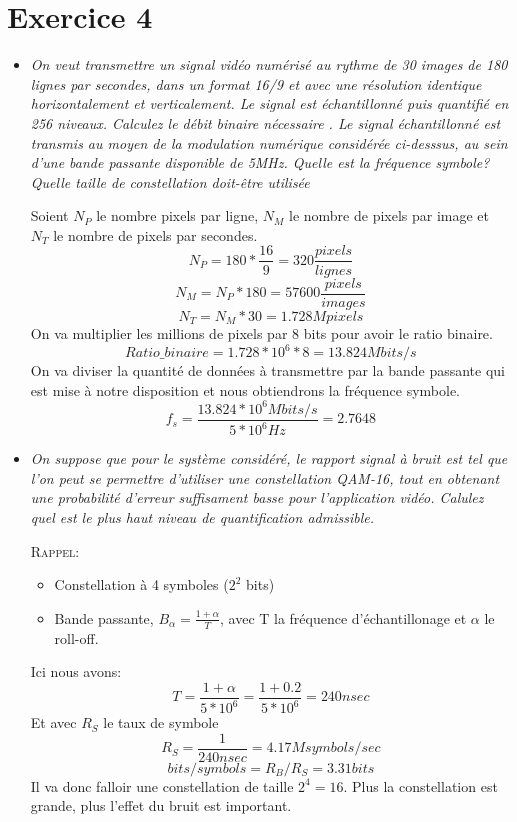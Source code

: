 \documentclass[a4paper, 11pt, onecolumn]{article}
\begin{document}
\section{Exercice 4}
	\begin{itemize}
		\item \textit{On veut transmettre un signal vidéo numérisé au rythme de 30 images de 180 lignes par secondes, dans un format 16/9 et avec une résolution identique horizontalement et verticalement. Le signal est échantillonné puis quantifié en 256 niveaux. Calculez le débit binaire nécessaire . Le signal échantillonné est transmis au moyen de la modulation numérique considérée ci-desssus, au sein d'une bande passante disponible de 5MHz. Quelle est la fréquence symbole? Quelle taille  de constellation doit-être utilisée}
		
		\begin{framed}
		Soient $N_P$ le nombre pixels par ligne, $N_M $ le nombre de pixels par image et $N_T$ le nombre de pixels par secondes.
		$$N_P = 180 *\frac{16}{9} = 320 \frac{pixels}{lignes}$$
		$$N_M = N_P*180 = 57600 \frac{pixels}{images}$$
		$$N_T = N_M * 30 = 1.728 Mpixels$$
		On va multiplier les millions de pixels par 8 bits pour avoir le ratio binaire.
		$$Ratio\_binaire = 1.728 * 10^6 * 8 = 13.824 Mbits/s$$
		On va diviser la quantité de données à transmettre par la bande passante qui est mise à notre disposition et nous obtiendrons la fréquence symbole.
		$$f_s = \frac{13.824 * 10^6 Mbits/s}{5 * 10^6 Hz} = 2.7648$$
		\end{framed}
		\item \textit{On suppose que pour le système considéré, le rapport signal à bruit est tel que l'on peut se permettre d'utiliser une constellation QAM-16, tout en obtenant une probabilité d'erreur suffisament basse pour l'application vidéo. Calulez quel est le plus haut niveau de quantification admissible.}
		\begin{framed}
			\textsc{Rappel:}
			\begin{itemize}
				\item Constellation à 4 symboles ($2^2$ bits)
				\item Bande passante, $B_\alpha = \frac{1+\alpha}{T}$, avec T la fréquence d'échantillonage et $\alpha$ le roll-off.
			\end{itemize}
			Ici nous avons:
			$$T = \frac{1+\alpha}{5*10^6} = \frac{1+0.2}{5*10^6} = 240nsec$$
			Et avec $R_S$ le taux de symbole
			$$R_S = \frac{1}{240nsec} = 4.17Msymbols/sec$$
			$$bits/symbols=R_B/R_S=3.31bits$$
			Il va donc falloir une constellation de taille $2^4=16$. Plus la constellation est grande, plus l'effet du bruit est important.
	
		\end{framed}
	
	\end{itemize}
\end{document}
